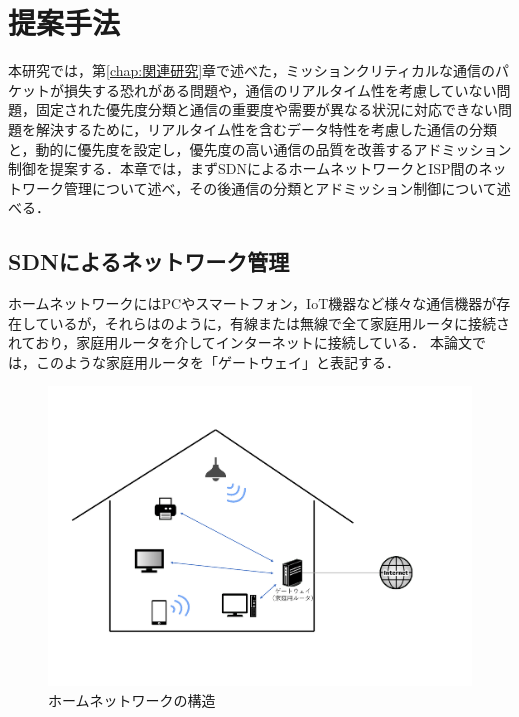\documentclass[a4paper,11pt,uplatex]{ujreport}
\begin{document}
\chapter{提案手法}
\label{chap:提案手法}

  本研究では，第\ref{chap:関連研究}章で述べた，ミッションクリティカルな通信のパケットが損失する恐れがある問題や，通信のリアルタイム性を考慮していない問題，固定された優先度分類と通信の重要度や需要が異なる状況に対応できない問題を解決するために，リアルタイム性を含むデータ特性を考慮した通信の分類と，動的に優先度を設定し，優先度の高い通信の品質を改善するアドミッション制御を提案する．本章では，まずSDNによるホームネットワークとISP間のネットワーク管理について述べ，その後通信の分類とアドミッション制御について述べる．

\section{SDNによるネットワーク管理}
\label{sec:SDNによるネットワーク管理}

  ホームネットワークにはPCやスマートフォン，IoT機器など様々な通信機器が存在しているが，それらはのように，有線または無線で全て家庭用ルータに接続されており，家庭用ルータを介してインターネットに接続している．
  本論文では，このような家庭用ルータを「ゲートウェイ」と表記する．

  \begin{figure}[!b]
    \centering
    \includegraphics[width=\linewidth]{img/homenetwork_trimmed.pdf}
    \caption{ホームネットワークの構造}
    \label{fig:homenetwork}
  \end{figure}
\end{document}
